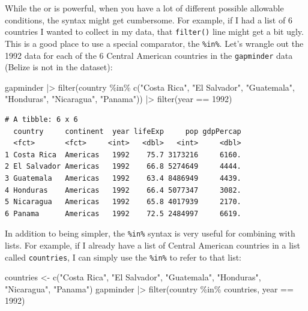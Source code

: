 \documentclass[
  letterpaper,
]{book}
\newenvironment{Shaded}{\begin{snugshade}}{\end{snugshade}}
\newcommand{\DecValTok}[1]{\textcolor[rgb]{0.68,0.00,0.00}{#1}}
\newcommand{\FunctionTok}[1]{\textcolor[rgb]{0.28,0.35,0.67}{#1}}
\newcommand{\NormalTok}[1]{\textcolor[rgb]{0.00,0.23,0.31}{#1}}
\newcommand{\OtherTok}[1]{\textcolor[rgb]{0.00,0.23,0.31}{#1}}
\newcommand{\SpecialCharTok}[1]{\textcolor[rgb]{0.37,0.37,0.37}{#1}}
\newcommand{\StringTok}[1]{\textcolor[rgb]{0.13,0.47,0.30}{#1}}
\begin{document}
While the \texttt{\textbar{}} or is powerful, when you have a lot of
different possible allowable conditions, the syntax might get
cumbersome. For example, if I had a list of 6 countries I wanted to
collect in my data, that \texttt{filter()} line might get a bit ugly.
This is a good place to use a special comparator, the \texttt{\%in\%}.
Let's wrangle out the 1992 data for each of the 6 Central American
countries in the \texttt{gapminder} data (Belize is not in the dataset):

\begin{Shaded}
\begin{Highlighting}[]
\NormalTok{gapminder }\SpecialCharTok{|\textgreater{}} 
  \FunctionTok{filter}\NormalTok{(country }\SpecialCharTok{\%in\%} \FunctionTok{c}\NormalTok{(}\StringTok{"Costa Rica"}\NormalTok{, }
                        \StringTok{"El Salvador"}\NormalTok{, }
                        \StringTok{"Guatemala"}\NormalTok{, }
                        \StringTok{"Honduras"}\NormalTok{, }
                        \StringTok{"Nicaragua"}\NormalTok{, }
                        \StringTok{"Panama"}\NormalTok{)) }\SpecialCharTok{|\textgreater{}} 
  \FunctionTok{filter}\NormalTok{(year }\SpecialCharTok{==} \DecValTok{1992}\NormalTok{)}
\end{Highlighting}
\end{Shaded}

\begin{verbatim}
# A tibble: 6 x 6
  country     continent  year lifeExp     pop gdpPercap
  <fct>       <fct>     <int>   <dbl>   <int>     <dbl>
1 Costa Rica  Americas   1992    75.7 3173216     6160.
2 El Salvador Americas   1992    66.8 5274649     4444.
3 Guatemala   Americas   1992    63.4 8486949     4439.
4 Honduras    Americas   1992    66.4 5077347     3082.
5 Nicaragua   Americas   1992    65.8 4017939     2170.
6 Panama      Americas   1992    72.5 2484997     6619.
\end{verbatim}

In addition to being simpler, the \texttt{\%in\%} syntax is very useful
for combining with lists. For example, if I already have a list of
Central American countries in a list called \texttt{countries}, I can
simply use the \texttt{\%in\%} to refer to that list:

\begin{Shaded}
\begin{Highlighting}[]
\NormalTok{countries }\OtherTok{\textless{}{-}} \FunctionTok{c}\NormalTok{(}\StringTok{"Costa Rica"}\NormalTok{,}
               \StringTok{"El Salvador"}\NormalTok{,}
               \StringTok{"Guatemala"}\NormalTok{,}
               \StringTok{"Honduras"}\NormalTok{,}
               \StringTok{"Nicaragua"}\NormalTok{, }
               \StringTok{"Panama"}\NormalTok{)}
\NormalTok{gapminder }\SpecialCharTok{|\textgreater{}} 
  \FunctionTok{filter}\NormalTok{(country }\SpecialCharTok{\%in\%}\NormalTok{ countries, }
\NormalTok{         year }\SpecialCharTok{==} \DecValTok{1992}\NormalTok{)}
\end{Highlighting}
\end{Shaded}
\end{document}
